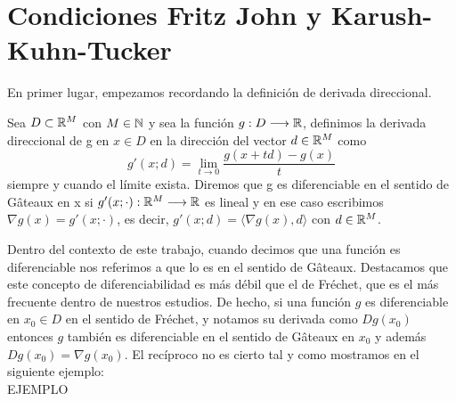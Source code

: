 \chapter{Condiciones Fritz John y Karush-Kuhn-Tucker}
		\newcommand{\barx}{\bar{x} }
		\newcommand{\dd}{\textbf{\emph{d}}}
		
	En primer lugar, empezamos recordando la definición de derivada direccional. 
	\begin{definicion}
			Sea $ D \subset \mathbb{R}^M $ con $ M \in \mathbb{N} $ y sea la función $ g: D \longrightarrow  \mathbb{R}$, definimos la derivada direccional de g en $ x \in D $ en la dirección del vector $ d\in \mathbb{R}^M $ como
			\[
			g'(x;d) = \lim_{t\rightarrow0}\frac{g(x+td) - g(x)}{t}
			\]
			siempre y cuando el límite exista. Diremos que g es diferenciable en el sentido de Gâteaux en x si $ g'(x;\cdot):\mathbb{R}^M \longrightarrow \mathbb{R} $ es lineal y en ese caso escribimos $ \nabla g(x) = g'(x;\cdot) $, es decir, $ g'(x;d) = \langle \nabla g(x), d\rangle $ con $ d \in \mathbb{R}^M $.
	\end{definicion}
	
	Dentro del contexto de este trabajo, cuando decimos que una función es diferenciable nos referimos a que lo es en el sentido de Gâteaux. Destacamos que este concepto de diferenciabilidad es más débil que el de Fréchet, que es el más frecuente dentro de nuestros estudios. De hecho, si una función $ g $ es diferenciable en $ x_0 \in D$ en el sentido de Fréchet, y notamos su derivada como $ Dg(x_0) $ entonces $ g $ también es diferenciable en el sentido de Gâteaux en $ x_0 $ y además $ Dg(x_0) = \nabla g(x_0) $. El recíproco no es cierto tal y como mostramos en el siguiente ejemplo:\\
	
	EJEMPLO \\
	
